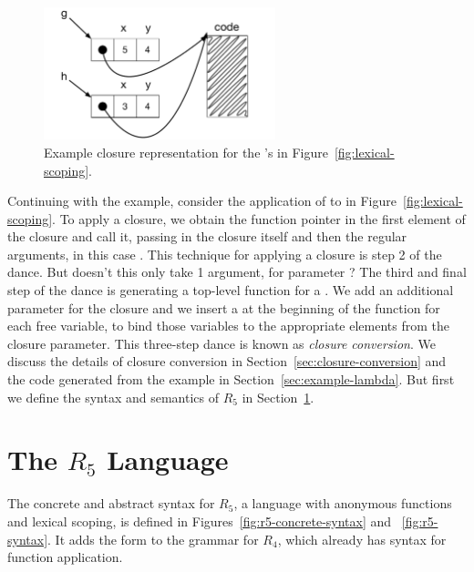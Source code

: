 \documentclass[11pt]{book}
\begin{document}
\begin{figure}[tbp]
\centering \includegraphics[width=0.6\textwidth]{figs/closures}
\caption{Example closure representation for the 's
  in Figure~\ref{fig:lexical-scoping}.}
\label{fig:closures}
\end{figure}

Continuing with the example, consider the application of  to
 in Figure~\ref{fig:lexical-scoping}.  To apply a closure, we
obtain the function pointer in the first element of the closure and
call it, passing in the closure itself and then the regular arguments,
in this case . This technique for applying a closure is step
2 of the dance.
%
But doesn't this  only take 1 argument, for parameter
? The third and final step of the dance is generating a
top-level function for a .  We add an additional
parameter for the closure and we insert a  at the beginning
of the function for each free variable, to bind those variables to the
appropriate elements from the closure parameter.
%
This three-step dance is known as \emph{closure conversion}.  We
discuss the details of closure conversion in
Section~\ref{sec:closure-conversion} and the code generated from the
example in Section~\ref{sec:example-lambda}. But first we define the
syntax and semantics of $R_5$ in Section~\ref{sec:r5}.

\section{The $R_5$ Language}
\label{sec:r5}

The concrete and abstract syntax for $R_5$, a language with anonymous
functions and lexical scoping, is defined in
Figures~\ref{fig:r5-concrete-syntax} and ~\ref{fig:r5-syntax}. It adds
the  form to the grammar for $R_4$, which already has
syntax for function application.
\end{document}
